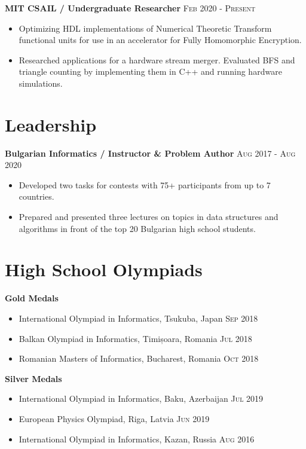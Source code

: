 \documentclass[letterpaper,11pt]{article}
\begin{document}
\textbf{MIT CSAIL / Undergraduate Researcher}
\hfill
\textsc{Feb 2020 - Present}
\begin{itemize}
    \item Optimizing HDL implementations of Numerical Theoretic Transform
        functional units for use in an accelerator for Fully Homomorphic
        Encryption.
    \item Researched applications for a hardware stream merger. Evaluated BFS
        and triangle counting by implementing them in C++ and running hardware
        simulations.
\end{itemize}

\section*{Leadership}
\textbf{Bulgarian Informatics / Instructor \& Problem Author}
\hfill
\textsc{Aug 2017 - Aug 2020}
\begin{itemize}
    \item Developed two tasks for contests with 75+ participants from up to 7
        countries.
    \item Prepared and presented three lectures on topics in data structures and
        algorithms in front of the top 20 Bulgarian high school students.
\end{itemize}

\section*{High School Olympiads}
\textbf{Gold Medals}
\begin{itemize}
    \item International Olympiad in Informatics, Tsukuba, Japan
        \hfill \textsc{Sep 2018}
    \item Balkan Olympiad in Informatics, Timișoara, Romania
        \hfill \textsc{Jul 2018}
    \item Romanian Masters of Informatics, Bucharest, Romania
        \hfill \textsc{Oct 2018}
\end{itemize}

\textbf{Silver Medals}
\begin{itemize}
    \item International Olympiad in Informatics, Baku, Azerbaijan
        \hfill \textsc{Jul 2019}
    \item European Physics Olympiad, Riga, Latvia
        \hfill \textsc{Jun 2019}
    \item International Olympiad in Informatics, Kazan, Russia
        \hfill \textsc{Aug 2016}
\end{itemize}
\end{document}
